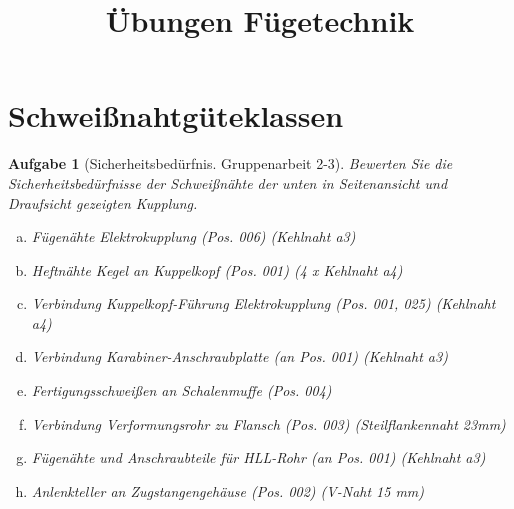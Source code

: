 \documentclass[11pt,a4paper,headsepline]{scrartcl}
\title{\"Ubungen F\"ugetechnik}
\date{}
\newtheorem{aufgabe}{Aufgabe}
\begin{document}
\vspace{-1cm}
\maketitle
\thispagestyle{fancy}
\pagestyle{fancy}
\vspace{-2cm}



\section*{Schwei{\ss}nahtg\"uteklassen}

\begin{aufgabe}[Sicherheitsbed\"urfnis. Gruppenarbeit 2-3] 
Bewerten Sie die Sicherheitsbed\"urfnisse der Schwei{\ss}n\"ahte der unten in Seitenansicht und Draufsicht gezeigten Kupplung.

\begin{enumerate}[a)]
\item F\"ugen\"ahte Elektrokupplung (Pos. 006) (Kehlnaht a3)
\item Heftn\"ahte Kegel an Kuppelkopf (Pos. 001) (4 x Kehlnaht a4)
\item Verbindung Kuppelkopf-F\"uhrung Elektrokupplung (Pos. 001, 025) (Kehlnaht a4)
\item Verbindung Karabiner-Anschraubplatte (an Pos. 001) (Kehlnaht a3)
\item Fertigungsschwei{\ss}en an Schalenmuffe (Pos. 004)
\item Verbindung Verformungsrohr zu Flansch (Pos. 003) (Steilflankennaht 23mm)
\item F\"ugen\"ahte und Anschraubteile f\"ur HLL-Rohr (an Pos. 001) (Kehlnaht a3)
\item Anlenkteller an Zugstangengeh\"ause (Pos. 002) (V-Naht 15 mm)
\end{enumerate}

\end{aufgabe}
\vspace{.5cm}
\end{document}

